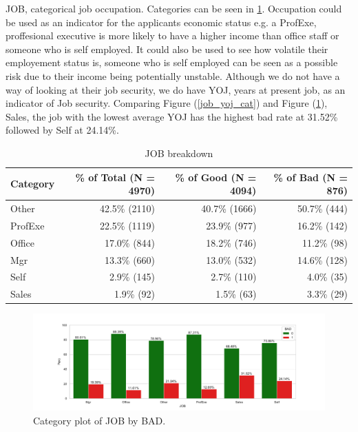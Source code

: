 JOB, categorical job occupation. Categories can be seen in \ref{job_cat}. Occupation could be used as an indicator for the applicants economic status e.g. a ProfExe, proffesional executive is more likely to have a higher income than office staff or someone who is self employed. It could also be used to see how volatile their employement status is, someone who is self employed can be seen as a possible risk due to their income being potentially unstable. Although we do not have a way of looking at their job security,  we do have YOJ,  years at present job, as an indicator of Job security. Comparing Figure (\ref{job_yoj_cat}) and Figure (\ref{job_cat}), Sales, the job with the lowest average YOJ has the highest bad rate at 31.52\% followed by Self at 24.14\%. 

\begin{table}[H]
	\centering
	\renewcommand{\arraystretch}{2}
	\begin{tabular}{lrrr}
		\toprule
		Category & \% of Total (N = 4970) & \% of Good (N = 4094) & \% of Bad (N = 876) \\
		\midrule
		Other & 42.5\% (2110) & 40.7\% (1666) &  50.7\% (444)  \\
		ProfExe & 22.5\% (1119) & 23.9\% (977) &  16.2\% (142)  \\
		Office & 17.0\% (844) & 18.2\% (746) &  11.2\% (98)  \\
		Mgr &  13.3\% (660) & 13.0\% (532) & 14.6\% (128)  \\
		Self & 2.9\% (145) & 2.7\% (110) &  4.0\% (35)  \\
		Sales & 1.9\% (92) & 1.5\% (63) &  3.3\% (29)  \\
		\bottomrule
	\end{tabular}
	\caption{JOB breakdown \label{job_count_tbl}}
\end{table}

\begin{figure}[H]
	\centering
	\includegraphics[scale=0.40]{figs/job_cat.pdf}
	\caption{Category plot of JOB by BAD. \label{job_cat}}
\end{figure}

